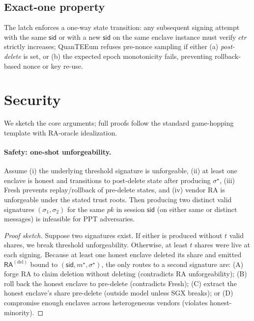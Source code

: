 \documentclass[runningheads,orivec]{llncs}
\newcommand{\prot}{\textsf{QuanTEEum}}
\newcommand{\sid}{\mathsf{sid}}
\newcommand{\RA}{\mathsf{RA}}
\begin{document}
\subsection{Exact-one property}
The latch enforces a one-way state transition: any subsequent signing attempt with the same $\sid$ or with a new $\sid$ on the same enclave instance must verify $ctr$ strictly increases; \prot{} refuses pre-nonce sampling if either (a) \emph{post-delete} is set, or (b) the expected epoch monotonicity fails, preventing rollback-based nonce or key re-use.

\section{Security}\label{sec:security}
We sketch the core arguments; full proofs follow the standard game-hopping template with RA-oracle idealization.

\paragraph{Safety: one-shot unforgeability.}
\begin{theorem}\label{thm:one-shot}
Assume (i) the underlying threshold signature is unforgeable, (ii) at least one enclave is honest and transitions to post-delete state after producing $\sigma^{\star}$, (iii) \textsf{Fresh} prevents replay/rollback of pre-delete states, and (iv) vendor RA is unforgeable under the stated trust roots. Then producing two distinct valid signatures $(\sigma_1,\sigma_2)$ for the same $pk$ in session $\mathsf{sid}$ (on either same or distinct messages) is infeasible for PPT adversaries.
\end{theorem}

\begin{proof}[Proof sketch]
Suppose two signatures exist. If either is produced without $t$ valid shares, we break threshold unforgeability. Otherwise, at least $t$ shares were live at each signing. Because at least one honest enclave deleted its share and emitted $\RA^{(\mathrm{del})}$ bound to $(\mathsf{sid},m^{\star},\sigma^{\star})$, the only routes to a second signature are: (A) forge RA to claim deletion without deleting (contradicts RA unforgeability); (B) roll back the honest enclave to pre-delete (contradicts \textsf{Fresh}); (C) extract the honest enclave's share pre-delete (outside model unless SGX breaks); or (D) compromise enough enclaves across heterogeneous vendors (violates honest-minority).
\end{proof}
\end{document}
